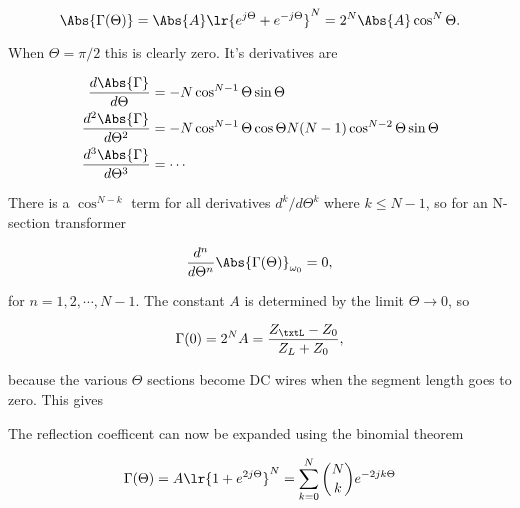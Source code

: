 \begin{dmath}\label{eqn:uwavesDeck7MultisectionTransformersCore:160}
\Abs{\Gamma(\Theta)} 
= 
\Abs{A} \lr{ e^{j \Theta} + e^{- j \Theta} }^N
= 
2^N \Abs{A} \cos^N\Theta.
\end{dmath}

When \( \Theta = \pi/2 \) this is clearly zero.  It's derivatives are

\begin{equation}\label{eqn:uwavesDeck7MultisectionTransformersCore:180}
\begin{aligned}
\frac{d \Abs{\Gamma}}{d\Theta} &= -N \cos^{N-1} \Theta \sin\Theta \\
\frac{d^2 \Abs{\Gamma}}{d\Theta^2} &= -N \cos^{N-1} \Theta \cos\Theta N(N-1) \cos^{N-2} \Theta \sin\Theta  \\
\frac{d^3 \Abs{\Gamma}}{d\Theta^3} &= \cdots 
\end{aligned}
\end{equation}

There is a \( \cos^{N-k} \) term for all derivatives \( d^k/d\Theta^k \) where \( k \le N-1 \), so for an N-section transformer

\begin{equation}\label{eqn:uwavesDeck7MultisectionTransformersCore:140}
\frac{d^n}{d\Theta^n} \Abs{\Gamma(\Theta)}_{\omega_0} = 0,
\end{equation}

for \( n = 1, 2, \cdots, N-1 \).  The constant \( A \) is determined by the limit \( \Theta \rightarrow 0 \), so

\begin{equation}\label{eqn:uwavesDeck7MultisectionTransformersCore:200}
\Gamma(0) = 2^N A = \frac{Z_\txtL - Z_0}{Z_L + Z_0}, 
\end{equation}

because the various \( \Theta \) sections become DC wires when the segment length goes to zero.  This gives


The reflection coefficent can now be expanded using the binomial theorem

\begin{dmath}\label{eqn:uwavesDeck7MultisectionTransformersCore:240}
\Gamma(\Theta) 
= A \lr{ 1 + e^{ 2 j \Theta } }^N
= \sum_{k = 0}^N \binom{N}{k} e^{ -2 j k \Theta}
\end{dmath}

